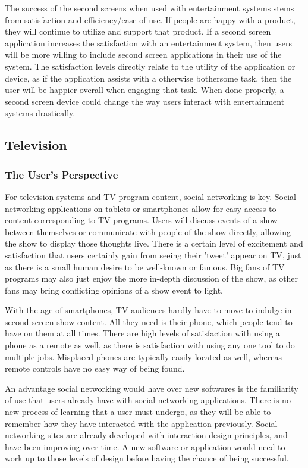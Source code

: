 \documentclass[11pt, oneside]{article}
\begin{document}
The success of the second screens when used with entertainment systems stems from satisfaction and efficiency/ease of use. If people are happy with a product, they will continue to utilize and support that product. If a second screen application increases the satisfaction with an entertainment system, then users will be more willing to include second screen applications in their use of the system. The satisfaction levels directly relate to the utility of the application or device, as if the application assists with a otherwise bothersome task, then the user will be happier overall when engaging that task. When done properly, a second screen device could change the way users interact with entertainment systems drastically.

\subsection{Television}
\subsubsection{The User's Perspective}
For television systems and TV program content, social networking is key. Social networking applications on tablets or smartphones allow for easy access to content corresponding to TV programs. Users will discuss events of a show between themselves or communicate with people of the show directly, allowing the show to display those thoughts live. There is a certain level of excitement and satisfaction that users certainly gain from seeing their 'tweet' appear on TV, just as there is a small human desire to be well-known or famous. Big fans of TV programs may also just enjoy the more in-depth discussion of the show, as other fans may bring conflicting opinions of a show event to light.

With the age of smartphones, TV audiences hardly have to move to indulge in second screen show content. All they need is their phone, which people tend to have on them at all times. There are high levels of satisfaction with using a phone as a remote as well, as there is satisfaction with using any one tool to do multiple jobs. Misplaced phones are typically easily located as well, whereas remote controls have no easy way of being found. 

An advantage social networking would have over new softwares is the familiarity of use that users already have with social networking applications. There is no new process of learning that a user must undergo, as they will be able to remember how they have interacted with the application previously. Social networking sites are already developed with interaction design principles, and have been improving over time. A new software or application would need to work up to those levels of design before having the chance of being successful.
\end{document}

